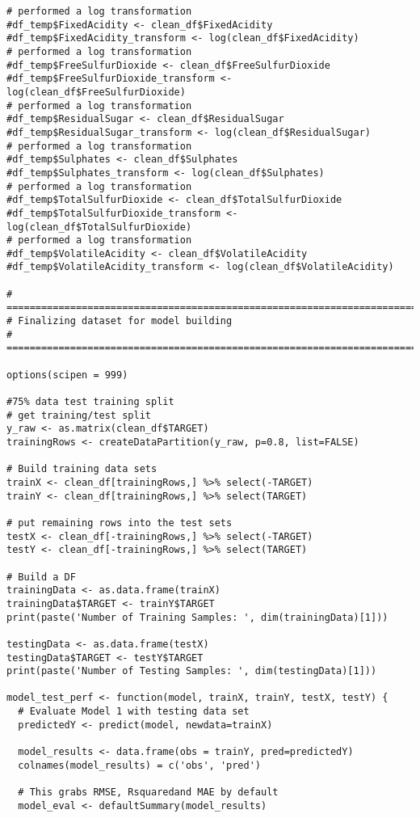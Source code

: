 \documentclass[
]{article}
\begin{document}
\begin{verbatim}
# performed a log transformation
#df_temp$FixedAcidity <- clean_df$FixedAcidity
#df_temp$FixedAcidity_transform <- log(clean_df$FixedAcidity)
# performed a log transformation
#df_temp$FreeSulfurDioxide <- clean_df$FreeSulfurDioxide
#df_temp$FreeSulfurDioxide_transform <- log(clean_df$FreeSulfurDioxide)
# performed a log transformation
#df_temp$ResidualSugar <- clean_df$ResidualSugar
#df_temp$ResidualSugar_transform <- log(clean_df$ResidualSugar)
# performed a log transformation
#df_temp$Sulphates <- clean_df$Sulphates
#df_temp$Sulphates_transform <- log(clean_df$Sulphates)
# performed a log transformation
#df_temp$TotalSulfurDioxide <- clean_df$TotalSulfurDioxide
#df_temp$TotalSulfurDioxide_transform <- log(clean_df$TotalSulfurDioxide)
# performed a log transformation
#df_temp$VolatileAcidity <- clean_df$VolatileAcidity
#df_temp$VolatileAcidity_transform <- log(clean_df$VolatileAcidity)

# =====================================================================================
# Finalizing dataset for model building
# =====================================================================================

options(scipen = 999)

#75% data test training split
# get training/test split
y_raw <- as.matrix(clean_df$TARGET)
trainingRows <- createDataPartition(y_raw, p=0.8, list=FALSE)

# Build training data sets
trainX <- clean_df[trainingRows,] %>% select(-TARGET)
trainY <- clean_df[trainingRows,] %>% select(TARGET)

# put remaining rows into the test sets
testX <- clean_df[-trainingRows,] %>% select(-TARGET)
testY <- clean_df[-trainingRows,] %>% select(TARGET)

# Build a DF
trainingData <- as.data.frame(trainX)
trainingData$TARGET <- trainY$TARGET
print(paste('Number of Training Samples: ', dim(trainingData)[1]))

testingData <- as.data.frame(testX)
testingData$TARGET <- testY$TARGET
print(paste('Number of Testing Samples: ', dim(testingData)[1]))

model_test_perf <- function(model, trainX, trainY, testX, testY) {
  # Evaluate Model 1 with testing data set
  predictedY <- predict(model, newdata=trainX)

  model_results <- data.frame(obs = trainY, pred=predictedY)
  colnames(model_results) = c('obs', 'pred')
  
  # This grabs RMSE, Rsquaredand MAE by default
  model_eval <- defaultSummary(model_results)
  

\end{verbatim}
\end{document}
